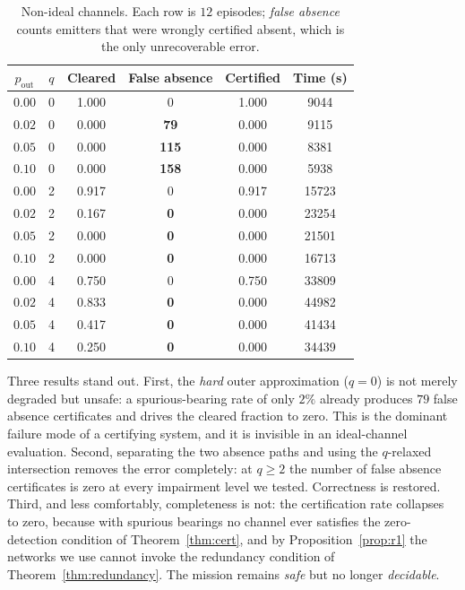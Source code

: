 \documentclass[preprint,12pt,3p]{elsarticle}
\theoremstyle{definition}
\begin{document}
\begin{table}[t]
\caption{Non-ideal channels. Each row is $12$ episodes; \emph{false absence} counts emitters that
were wrongly certified absent, which is the only unrecoverable error.}
\label{tab:outlier}
\centering
\small
\begin{tabular}{cccccc}
\toprule
$p_{\mathrm{out}}$ & $q$ & Cleared & \textbf{False absence} & Certified & Time (s) \\
\midrule
$0.00$ & 0 & 1.000 & 0 & 1.000 & 9044 \\
$0.02$ & 0 & 0.000 & \textbf{79} & 0.000 & 9115 \\
$0.05$ & 0 & 0.000 & \textbf{115} & 0.000 & 8381 \\
$0.10$ & 0 & 0.000 & \textbf{158} & 0.000 & 5938 \\
\midrule
$0.00$ & 2 & 0.917 & 0 & 0.917 & 15723 \\
$0.02$ & 2 & 0.167 & \textbf{0} & 0.000 & 23254 \\
$0.05$ & 2 & 0.000 & \textbf{0} & 0.000 & 21501 \\
$0.10$ & 2 & 0.000 & \textbf{0} & 0.000 & 16713 \\
\midrule
$0.00$ & 4 & 0.750 & 0 & 0.750 & 33809 \\
$0.02$ & 4 & 0.833 & \textbf{0} & 0.000 & 44982 \\
$0.05$ & 4 & 0.417 & \textbf{0} & 0.000 & 41434 \\
$0.10$ & 4 & 0.250 & \textbf{0} & 0.000 & 34439 \\
\bottomrule
\end{tabular}
\end{table}

Three results stand out. First, the \emph{hard} outer approximation ($q=0$) is not merely
degraded but unsafe: a spurious-bearing rate of only $2\%$ already produces $79$ false absence
certificates and drives the cleared fraction to zero. This is the dominant failure mode of a certifying
system, and it is invisible in an ideal-channel evaluation.
Second, separating the two absence paths and using the $q$-relaxed intersection removes the error
completely: at $q\ge2$ the number of false absence certificates is zero at every impairment level
we tested. Correctness is restored. Third, and less comfortably, completeness is not: the
certification rate collapses to zero, because with spurious bearings no channel ever satisfies the
zero-detection condition of Theorem~\ref{thm:cert}, and by
Proposition~\ref{prop:r1} the networks we use cannot invoke the redundancy condition of
Theorem~\ref{thm:redundancy}. The mission remains \emph{safe} but no longer \emph{decidable}.
\end{document}
